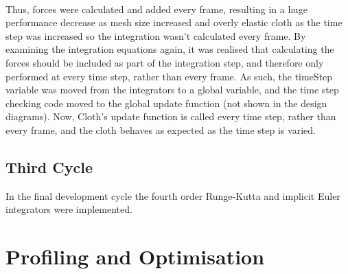 \\Thus, forces were calculated and added every frame, resulting in a huge performance decrease as mesh size increased and overly elastic cloth as the time step was increased so the integration wasn't calculated every frame. By examining the integration equations again, it was realised that calculating the forces should be included as part of the integration step, and therefore only performed at every time step, rather than every frame. As such, the timeStep variable was moved from the integrators to a global variable, and the time step checking code moved to the global update function (not shown in the design diagrams). Now, Cloth's update function is called every time step, rather than every frame, and the cloth behaves as expected as the time step is varied.

\subsection{Third Cycle}
In the final development cycle the fourth order Runge-Kutta and implicit Euler integrators were implemented.

\section{Profiling and Optimisation}
\label{sec:optimisation}

